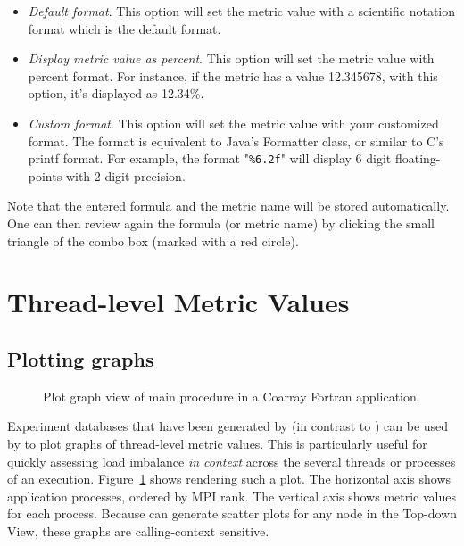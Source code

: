 \begin{itemize}
\begin{itemize}
\item \textit{Default format}. This option will set the metric value with a scientific notation format which is the default format.

\item \textit{Display metric value as percent}. This option will set the metric value with percent format. For instance, if the metric has a value 12.345678, with this option, it's displayed as 12.34\%.

\item \textit{Custom format}. This option will set the metric value with your customized format. The format is equivalent to Java's Formatter class, or similar to C's printf format. For example, the format "\texttt{\%6.2f}" will display 6 digit floating-points with 2 digit precision.

\end{itemize}

\end{itemize}

Note that the entered formula and the metric name will be stored automatically.
One can then review again the formula (or metric name) by clicking the small triangle of the combo box (marked with a red circle).



\section{Thread-level Metric Values}
\label{sec:hpcviewer:thread-level}

\subsection{Plotting graphs}
\label{sec:hpcviewer:plots}
\begin{figure}[t]
\caption{Plot graph view of main procedure in a Coarray Fortran application.}
\label{fig:hpcviewer-view-scatterplot}
\end{figure}


\HPCToolkit{} Experiment databases that have been generated by \hpcprofmpi{} (in contrast to \hpcprof{}) can be used by \hpcviewer{} to plot graphs of thread-level metric values.
This is particularly useful for quickly assessing load imbalance \emph{in context} across the several threads or processes of an execution.
Figure~\ref{fig:hpcviewer-view-scatterplot} shows \hpcviewer{} rendering such a plot.
The horizontal axis shows application processes, ordered by MPI rank.
The vertical axis shows metric values for each process.
Because \hpcviewer{} can generate scatter plots for any node in the Top-down View, these graphs are calling-context sensitive.

